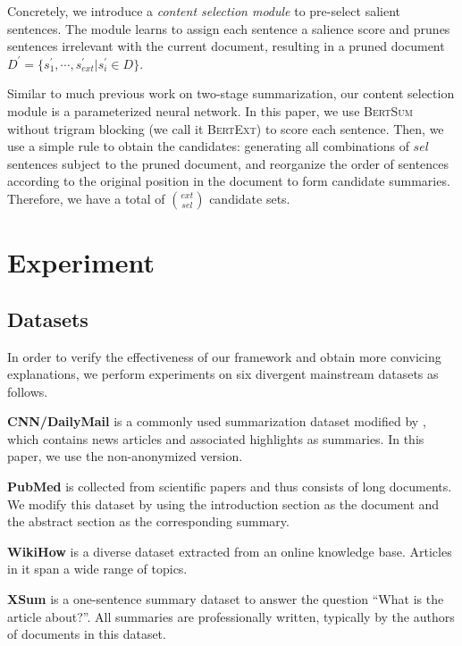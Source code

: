 Concretely, we introduce a \textit{content selection module} to pre-select salient sentences.
The module learns to assign each sentence a salience score and prunes sentences irrelevant with the current document, resulting in a pruned document  ${D}^{'} = \{ s^{'}_1, \cdots, s^{'}_{ext} | s^{'}_i \in D \}$.

Similar to much previous work on two-stage summarization, our content selection module is a parameterized neural network. In this paper, we use \textsc{BertSum} \cite{liu2019text} without trigram blocking (we call it \textsc{BertExt}) to score each sentence. Then,  we use a simple rule to obtain the candidates: generating all combinations of $sel$ sentences subject to the pruned document, and reorganize the order of sentences according to the original position in the document to form candidate summaries. Therefore, we have a total of $\binom{ext}{sel}$ candidate sets.

\section{Experiment}

\subsection{Datasets}
In order to verify the effectiveness of our framework and obtain more convicing explanations, we perform experiments on six divergent mainstream datasets as follows.

\textbf{CNN/DailyMail} \cite{hermann2015teaching} is a commonly used summarization dataset modified by \citet{nallapati2016abstractive}, which contains news articles and
associated highlights as summaries. In this paper, we use the non-anonymized version.

\textbf{PubMed} \cite{cohan2018discourse} is collected from scientific papers and thus consists of long documents. We modify this dataset by using the introduction section as the document and the abstract section as the corresponding summary.

\textbf{WikiHow} \cite{koupaee2018wikihow} is a diverse dataset extracted from an online knowledge base. Articles in it span a wide range of topics.

\textbf{XSum} \cite{narayan2018don} is a one-sentence summary dataset to answer the question ``What is the article about?''. All summaries are professionally written, typically by the authors of documents in this dataset.

